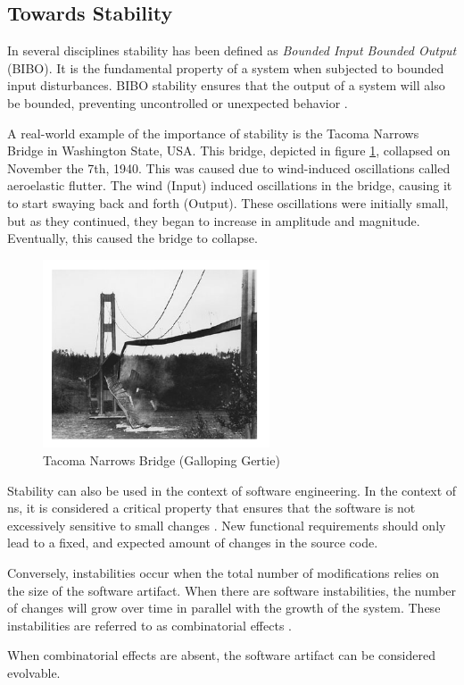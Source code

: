 \subsection{Towards Stability} \label{subsec:on_stability}

In several disciplines stability has been defined as \emph{Bounded Input Bounded Output}
(BIBO). It is the fundamental property of a system when subjected to bounded input
disturbances. BIBO stability ensures that the output of a system will also be bounded,
preventing uncontrolled or unexpected behavior \parencite[270]{mannaert_normalized_2016}. 

A real-world example of the importance of stability is the Tacoma Narrows Bridge in
Washington State, USA. This bridge, depicted in figure \ref*{fig:bridge}, collapsed on
November the 7th, 1940. This was caused due to wind-induced oscillations called
aeroelastic flutter. The wind (Input) induced oscillations in the bridge, causing it to
start swaying back and forth (Output). These oscillations were initially small, but as
they continued, they began to increase in amplitude and magnitude. Eventually, this 
caused the bridge to collapse.

\begin{figure}[H]
    \centering
    \includegraphics[width=0.6\textwidth]{Figures/bridge.pdf}
    \caption[TNB]{Tacoma Narrows Bridge (Galloping Gertie)}
    \label{fig:bridge}
\end{figure}

Stability can also be used in the context of software engineering. In the context of
\gls{ns}, it is considered a critical property that ensures that the software is not
excessively sensitive to small changes \parencite[270]{mannaert_normalized_2016}. New
functional requirements should only lead to a fixed, and expected amount of changes in
the source code. 

Conversely, instabilities occur when the total number of modifications relies on the size
of the software artifact. When there are software instabilities, the number of changes
will grow over time in parallel with the growth of the system. These instabilities are
referred to as combinatorial effects \parencite[270]{mannaert_normalized_2016}. 

When combinatorial effects are absent, the software artifact can be considered evolvable.